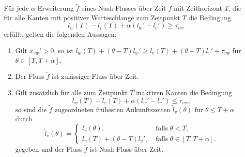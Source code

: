 \begin{lemma}
	Für jede $\alpha$-Erweiterung $\tilde{f}$ eines Nash-Flusses über Zeit $f$ mit Zeithorizont $T$, die für alle Kanten mit positiver Warteschlange zum Zeitpunkt $T$ die Bedingung
	$$l_w(T) - l_v(T) + \alpha(l_w' - l_v') \geq \tau_{vw}$$
	erfüllt, gelten die folgenden Aussagen:
	\begin{enumerate}[label=(\roman*)]
		\item Gilt $x_{vw}' > 0$, so ist $l_w(T) + (\theta - T)l_w' \geq l_v(T) + (\theta - T)l_v' + \tau_{vw}$ für $\theta\in[T, T+\alpha]$.
		\item Der Fluss $\tilde{f}$ ist zulässiger Fluss über Zeit.
		\item Gilt zusätzlich für alle zum Zeitpunkt $T$ inaktiven Kanten die Bedingung $$
		l_w(T) - l_v(T) + \alpha(l_w' -l_v') \leq \tau_{vw},
		$$
		so sind die $\tilde{f}$ zugeordneten frühesten Ankunftszeiten $\tilde{l}_v(\theta)$ für $\theta \leq T+\alpha$ durch
		$$\tilde{l}_v(\theta) = \begin{cases}
		l_v(\theta), & \text{ falls $\theta < T$,} \\
		l_v(T) + (\theta - T) l_v', & \text{ falls $\theta \in [T, T+\alpha]$.}
		\end{cases}$$
		gegeben und der Fluss $\tilde{f}$ ist Nash-Fluss über Zeit.
	\end{enumerate}
\end{lemma}
